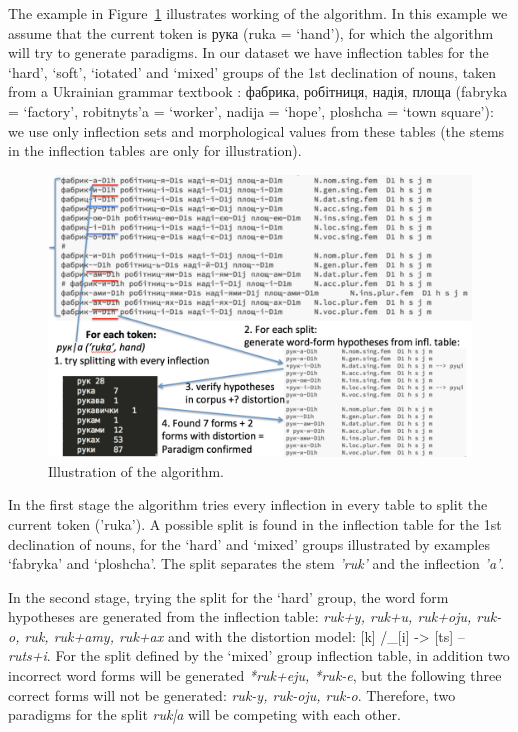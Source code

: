 \documentclass[11pt,a4paper]{article}
\begin{document}
The example in Figure~\ref{fig:alg_example} illustrates working of the algorithm. In this example we assume that the current token is рука (ruka = `hand'), for which the algorithm will try to generate paradigms. In our dataset we have inflection tables for the `hard', `soft', `iotated' and `mixed' groups of the 1st declination of nouns, taken from a Ukrainian grammar textbook \cite{hryshchenko1997sulm}: фабрика, робітниця, надія, площа (fabryka = `factory', robitnyts'a = `worker', nadija = `hope', ploshcha = `town square'): we use only inflection sets and morphological values from these tables (the stems in the inflection tables are only for illustration).

\begin{figure}
	\includegraphics[width=\linewidth]{algorithm-illustration.jpg}
	\caption{Illustration of the algorithm.}
	\label{fig:alg_example}
\end{figure}

In the first stage the algorithm tries every inflection in every table to split the current token ('ruka'). A possible split is found in the inflection table for the 1st declination of nouns, for the `hard' and `mixed' groups illustrated by examples `fabryka' and `ploshcha'. The split separates the stem \emph{'ruk'} and the inflection \emph{'a'}.

In the second stage, trying the split for the `hard' group, the word form hypotheses are generated from the inflection table: \emph{ruk+y, ruk+u, ruk+oju, ruk-o, ruk, ruk+amy, ruk+ax} and with the distortion model: [k] /\_[i] -> [ts] -- \emph{ruts+i}. For the split defined by the `mixed' group inflection table, in addition two incorrect word forms will be generated \emph{*ruk+eju, *ruk-e}, but the following three correct forms will not be generated: \emph{ruk-y, ruk-oju, ruk-o}. Therefore, two paradigms for the split \emph{ruk|a} will be competing with each other.
\end{document}

